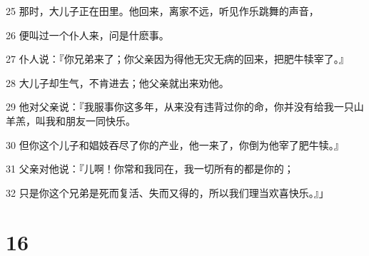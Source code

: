 \par 25 那时，大儿子正在田里。他回来，离家不远，听见作乐跳舞的声音，
\par 26 便叫过一个仆人来，问是什麽事。
\par 27 仆人说：『你兄弟来了；你父亲因为得他无灾无病的回来，把肥牛犊宰了。』
\par 28 大儿子却生气，不肯进去；他父亲就出来劝他。
\par 29 他对父亲说：『我服事你这多年，从来没有违背过你的命，你并没有给我一只山羊羔，叫我和朋友一同快乐。
\par 30 但你这个儿子和娼妓吞尽了你的产业，他一来了，你倒为他宰了肥牛犊。』
\par 31 父亲对他说：『儿啊！你常和我同在，我一切所有的都是你的；
\par 32 只是你这个兄弟是死而复活、失而又得的，所以我们理当欢喜快乐。』」

\chapter{16}

